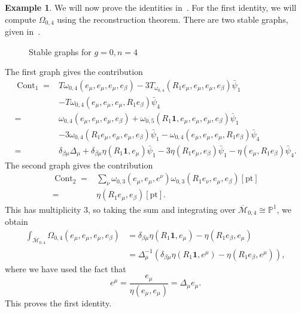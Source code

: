 \documentclass[10pt]{amsart}
\theoremstyle{definition}
\newtheorem{exm}[thm]{Example}
\theoremstyle{remark}
\theoremstyle{plain}
\theoremstyle{definition}
\theoremstyle{remark}
\renewcommand{\P}{\mathbb{P}}
\newcommand{\Mbar}{\overline{\mathcal{M}}}
\newcommand{\mr}[1]{\mathrm{#1}}
\newcommand{\1}{\mathbf{1}}
\newcommand{\2}{\mathbf{2}}
\newcommand{\3}{\mathbf{3}}
\newcommand{\pt}{\mr{pt}}
\DeclareMathOperator{\Cont}{Cont}
\begin{document}
\begin{exm}
    We will now prove the identities in~. For the first identity, we will compute $\Omega_{0,4}$ using the reconstruction theorem. There are two stable graphs, given in~.
    \begin{figure}[htpb]
    \begin{center}
    \end{center}
    \caption{Stable graphs for $g=0, n=4$}%
    \label{fig:04graphs}
    \end{figure}
The first graph gives the contribution
\begin{align*}
    \Cont_1 ={}& T \omega_{0,4}(e_{\mu}, e_{\mu}, e_{\mu}, e_{\beta}) - 3 T_{\omega_{0,4}}(R_1 e_{\mu}, e_{\mu}, e_{\mu}, e_{\beta}) \bar{\psi}_1 \\ 
    &- T \omega_{0,4}(e_{\mu}, e_{\mu}, e_{\mu}, R_1 e_{\beta}) \bar{\psi}_4 \\
    ={}& \omega_{0,4}(e_{\mu}, e_{\mu}, e_{\mu}, e_{\beta}) + \omega_{0,5}(R_1 \1, e_{\mu}, e_{\mu}, e_{\mu}, e_{\beta}) \bar{\psi}_1 \\
    &- 3 \omega_{0,4}(R_1 e_{\mu}, e_{\mu}, e_{\mu}, e_{\beta}) \bar{\psi}_1 - \omega_{0,4}(e_{\mu}, e_{\mu}, e_{\mu}, R_1 e_{\beta}) \bar{\psi}_4 \\
    ={}& \delta_{\beta\mu} \Delta_{\mu} + \delta_{\beta\mu} \eta(R_1 \1, e_{\mu}) \bar{\psi}_1 - 3 \eta (R_1 e_{\mu}, e_{\beta}) \bar{\psi}_1 - \eta(e_{\mu}, R_1 e_{\beta}) \bar{\psi}_4.
\end{align*}
The second graph gives the contribution
\begin{align*}
    \Cont_2 ={}& \sum_{\nu} \omega_{0,3}(e_{\mu}, e_{\mu}, e^{\nu}) \omega_{0,3}(R_1 e_{\nu}, e_{\mu}, e_{\beta}) [\pt] \\
    ={}& \eta(R_1 e_{\mu},e_{\beta}) [\pt].
\end{align*}
This has multiplicity $3$, so taking the sum and integrating over $\Mbar_{0,4} \cong \P^1$, we obtain
\begin{align*}
    \int_{\Mbar_{0,4}} \Omega_{0,4}(e_{\mu}, e_{\mu}, e_{\mu}, e_{\beta}) &= \delta_{\beta\mu} \eta(R_1 \1, e_{\mu}) - \eta(R_1 e_{\beta}, e_{\mu}) \\
    &= \Delta_{\mu}^{-1} (\delta_{\beta\mu} \eta(R_1 \1, e^{\mu}) - \eta(R_1 e_{\beta}, e^{\mu})),
\end{align*}
where we have used the fact that
\[ e^{\mu} = \frac{e_{\mu}}{\eta(e_{\mu}, e_{\mu})} = \Delta_{\mu} e_{\mu}. \]
This proves the first identity.


\end{exm}
\end{document}
